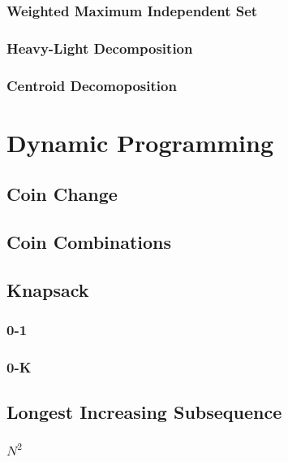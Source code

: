\documentclass{article}
\begin{document}
\subsubsection{Weighted Maximum Independent Set}

\subsubsection{Heavy-Light Decomposition}

\subsubsection{Centroid Decomoposition}


\section{Dynamic Programming}
\subsection{Coin Change}

\subsection{Coin Combinations}


\subsection{Knapsack}
\subsubsection{0-1}

\subsubsection{0-K}


\subsection{Longest Increasing Subsequence}
\subsubsection{$N^{2}$}

\end{document}

